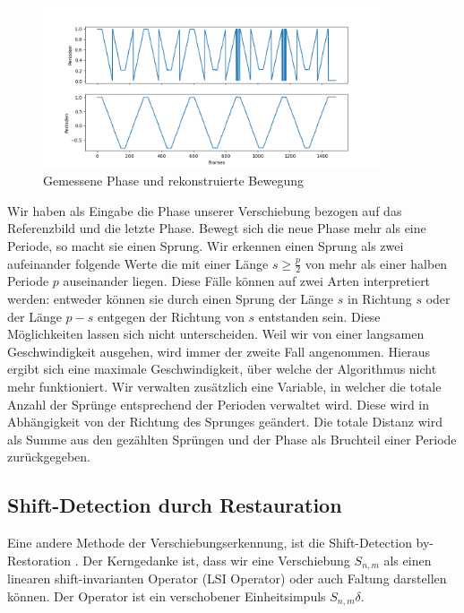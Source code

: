 \documentclass[10pt,a4paper]{scrarticle}
\begin{document}
        \begin{figure}
\includegraphics[width=10cm]{Abbildungen/Phase_Unwrapping.png}
  \centering
  \caption{Gemessene Phase und rekonstruierte Bewegung}%
  \label{fig:phase_unwrapping}
\end{figure}

        Wir haben als Eingabe die Phase unserer Verschiebung bezogen auf das Referenzbild und die letzte Phase. Bewegt sich die neue Phase mehr als eine Periode, so macht sie einen Sprung. Wir erkennen einen Sprung als zwei aufeinander folgende Werte die mit einer Länge $s\geq \frac{p}{2}$ von mehr als einer halben Periode $p$ auseinander liegen. Diese Fälle können auf zwei Arten interpretiert werden: entweder können sie durch einen Sprung der Länge $s$ in Richtung $s$ oder der Länge $p-s$ entgegen der Richtung von $s$ entstanden sein.
        Diese Möglichkeiten lassen sich nicht unterscheiden. Weil wir von einer langsamen Geschwindigkeit ausgehen, wird immer der zweite Fall angenommen. Hieraus ergibt sich eine maximale Geschwindigkeit, über welche der Algorithmus nicht mehr funktioniert.
        Wir verwalten zusätzlich eine Variable, in welcher die totale Anzahl der Sprünge entsprechend der Perioden verwaltet wird. Diese wird in Abhängigkeit von der Richtung des Sprunges geändert. Die totale Distanz wird als Summe aus den gezählten Sprüngen und der Phase als Bruchteil einer Periode zurückgegeben.

	\subsection{Shift-Detection durch Restauration}\label{Shift_detection_by_Restoration}
	Eine andere Methode der Verschiebungserkennung, ist die Shift-Detection by-Restoration \cite{suesse1999shift}. Der Kerngedanke ist, dass wir eine Verschiebung $S_{n,m}$ als einen linearen shift-invarianten Operator (LSI Operator) oder auch Faltung darstellen können. Der Operator ist ein verschobener Einheitsimpuls $S_{n,m}\delta$.
\end{document}
